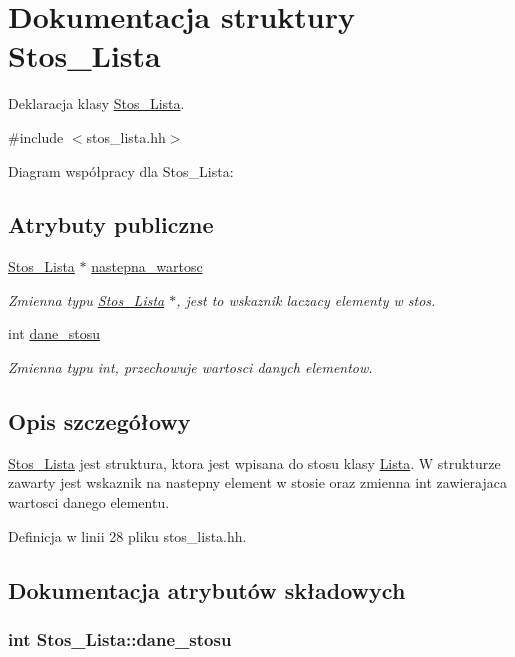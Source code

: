 \hypertarget{struct_stos___lista}{\section{\-Dokumentacja struktury \-Stos\-\_\-\-Lista}
\label{struct_stos___lista}
}


\-Deklaracja klasy \hyperlink{struct_stos___lista}{\-Stos\-\_\-\-Lista}.  




{\ttfamily \#include $<$stos\-\_\-lista.\-hh$>$}



\-Diagram współpracy dla \-Stos\-\_\-\-Lista\-:
\subsection*{\-Atrybuty publiczne}
\begin{DoxyCompactItemize}
\item 
\hyperlink{struct_stos___lista}{\-Stos\-\_\-\-Lista} $\ast$ \hyperlink{struct_stos___lista_a2b4b6b290201eda9964dafc81b123065}{nastepna\-\_\-wartosc}
\begin{DoxyCompactList}\small\item\em \-Zmienna typu \hyperlink{struct_stos___lista}{\-Stos\-\_\-\-Lista} $\ast$, jest to wskaznik laczacy elementy w stos. \end{DoxyCompactList}\item 
int \hyperlink{struct_stos___lista_a00c1b5347b912366037a5fb9c84efe91}{dane\-\_\-stosu}
\begin{DoxyCompactList}\small\item\em \-Zmienna typu int, przechowuje wartosci danych elementow. \end{DoxyCompactList}\end{DoxyCompactItemize}


\subsection{\-Opis szczegółowy}
\hyperlink{struct_stos___lista}{\-Stos\-\_\-\-Lista} jest struktura, ktora jest wpisana do stosu klasy \hyperlink{class_lista}{\-Lista}. \-W strukturze zawarty jest wskaznik na nastepny element w stosie oraz zmienna int zawierajaca wartosci danego elementu. 

\-Definicja w linii 28 pliku stos\-\_\-lista.\-hh.



\subsection{\-Dokumentacja atrybutów składowych}
\hypertarget{struct_stos___lista_a00c1b5347b912366037a5fb9c84efe91}{
\subsubsection[{dane\-\_\-stosu}]{\setlength{\rightskip}{0pt plus 5cm}int {\bf \-Stos\-\_\-\-Lista\-::dane\-\_\-stosu}}}\label{struct_stos___lista_a00c1b5347b912366037a5fb9c84efe91}


